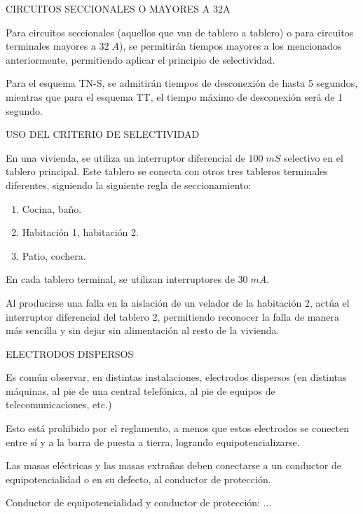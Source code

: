 CIRCUITOS SECCIONALES O MAYORES A 32A

Para circuitos seccionales (aquellos que van de tablero a tablero) o para circuitos terminales mayores a $32\; A$), se permitirán tiempos mayores a los mencionados anteriormente, permitiendo aplicar el principio de selectividad.

Para el esquema TN-S, se admitirán tiempos de desconexión de hasta 5 segundos, mientras que para el esquema TT, el tiempo máximo de desconexión será de 1 segundo.

USO DEL CRITERIO DE SELECTIVIDAD
\begin{ejemplo}
	En una vivienda, se utiliza un interruptor diferencial de $100\; mS$ selectivo en el tablero principal. Este tablero se conecta con otros tres tableros terminales diferentes, siguiendo la siguiente regla de seccionamiento:
	\begin{enumerate}
		\item Cocina, baño.
		\item Habitación 1, habitación 2.
		\item Patio, cochera.
	\end{enumerate}
 	En cada tablero terminal, se utilizan interruptores de $30\; mA$.
 	
 	Al producirse una falla en la aislación de un velador de la habitación 2, actúa el interruptor diferencial del tablero 2, permitiendo reconocer la falla de manera más sencilla y sin dejar sin alimentación al resto de la vivienda.
\end{ejemplo}


ELECTRODOS DISPERSOS

Es común observar, en distintas instalaciones, electrodos dispersos (en distintas máquinas, al pie de una central telefónica, al pie de equipos de telecomunicaciones, etc.)

Esto está prohibido por el reglamento, a menos que estos electrodos se conecten entre sí y a la barra de puesta a tierra, logrando equipotencializarse.

Las masas eléctricas y las masas extrañas deben conectarse a un conductor de equipotencialidad o en su defecto, al conductor de protección.

Conductor de equipotencialidad y conductor de protección: ...

